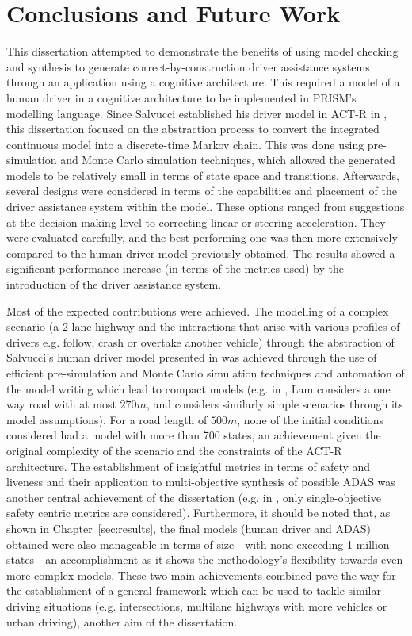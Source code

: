 \chapter{Conclusions and Future Work}
\label{sec:conclusion}

This dissertation attempted to demonstrate the benefits of using model checking and synthesis to generate correct-by-construction driver assistance systems through an application using a cognitive architecture. This required a model of a human driver in a cognitive architecture to be implemented in PRISM's modelling language. Since Salvucci established his driver model in ACT-R in \cite{salvucci_1}, this dissertation focused on the abstraction process to convert the integrated continuous model into a discrete-time Markov chain. This was done using pre-simulation and Monte Carlo simulation techniques, which allowed the generated models to be relatively small in terms of state space and transitions. Afterwards, several designs were considered in terms of the capabilities and placement of the driver assistance system within the model. These options ranged from suggestions at the decision making level to correcting linear or steering acceleration. They were evaluated carefully, and the best performing one was then more extensively compared to the human driver model previously obtained. The results showed a significant performance increase (in terms of the metrics used) by the introduction of the driver assistance system.

Most of the expected contributions were achieved. The modelling of a complex scenario (a 2-lane highway and the interactions that arise with various profiles of drivers e.g. follow, crash or overtake another vehicle) through the abstraction of Salvucci's human driver model presented in \cite{salvucci_1} was achieved through the use of efficient pre-simulation and Monte Carlo simulation techniques and automation of the model writing which lead to compact models (e.g. in \cite{lam}, Lam considers a one way road with at most $270m$, and \cite{games} considers similarly simple scenarios through its model assumptions). For a road length of $500m$, none of the initial conditions considered had a model with more than 700 states, an achievement given the original complexity of the scenario and the constraints of the ACT-R architecture. The establishment of insightful metrics in terms of safety and liveness and their application to multi-objective synthesis of possible ADAS was another central achievement of the dissertation (e.g. in \cite{lam}, only single-objective safety centric metrics are considered). Furthermore, it should be noted that, as shown in Chapter~\ref{sec:results}, the final models (human driver and ADAS) obtained were also manageable in terms of size - with none exceeding 1 million states - an accomplishment as it shows the methodology's flexibility towards even more complex models. These two main achievements combined pave the way for the establishment of a general framework which can be used to tackle similar driving situations (e.g. intersections, multilane highways with more vehicles or urban driving), another aim of the dissertation. 

